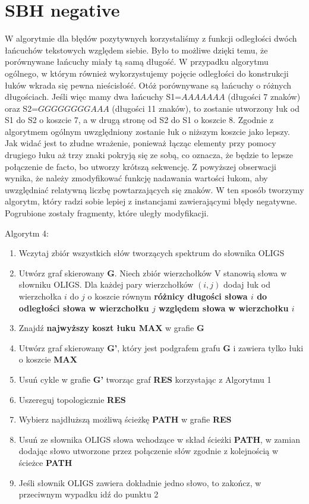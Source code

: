 \documentclass[a4paper,10pt]{article}
\begin{document}
\section{SBH negative}
W algorytmie dla błędów pozytywnych korzystaliśmy z funkcji odległości dwóch łańcuchów tekstowych względem siebie. Było to możliwe dzięki temu, że porównywane łańcuchy miały tą samą długość. W przypadku algorytmu ogólnego, w którym również wykorzystujemy pojęcie odległości do konstrukcji łuków wkrada się pewna nieścisłość. Otóż porównywane są łańcuchy o różnych długościach. Jeśli więc mamy dwa łańcuchy S1=$AAAAAAA$ (długości 7 znaków) oraz S2=$GGGGGGGGAAA$ (długości 11 znaków), to zostanie utworzony łuk od S1 do S2 o koszcie 7, a w drugą stronę od S2 do S1 o koszcie 8. Zgodnie z algorytmem ogólnym uwzględniony zostanie łuk o niższym koszcie jako lepszy. Jak widać jest to złudne wrażenie, ponieważ łącząc elementy przy pomocy drugiego łuku aż trzy znaki pokryją się ze sobą, co oznacza, że będzie to lepsze połączenie de facto, bo utworzy krótszą sekwencję.
Z powyższej obserwacji wynika, że należy zmodyfikować funkcję nadawania wartości łukom, aby uwzględniać relatywną liczbę powtarzających się znaków. W ten sposób tworzymy algorytm, który radzi sobie lepiej z instancjami zawierającymi błędy negatywne. Pogrubione zostały fragmenty, które uległy modyfikacji.

Algorytm 4:
\begin{enumerate}
 \item Wczytaj zbiór wszystkich słów tworzących spektrum do słownika OLIGS
 \item Utwórz graf skierowany {\bf G}. Niech zbiór wierzchołków V stanowią słowa w słowniku OLIGS. Dla każdej pary wierzchołków $(i,j)$ dodaj łuk od wierzchołka $i$ do $j$ o koszcie równym {\bf różnicy długości słowa $i$ do odległości słowa w wierzchołku $j$ względem słowa w wierzchołku $i$}
 \item Znajdź {\bf najwyższy koszt łuku MAX} w grafie {\bf G}
 \item Utwórz graf skierowany {\bf G'}, który jest podgrafem grafu {\bf G} i zawiera tylko łuki o koszcie {\bf MAX}
 \item Usuń cykle w grafie {\bf G'} tworząc graf {\bf RES} korzystając z Algorytmu 1
 \item Uszereguj topologicznie {\bf RES}
 \item Wybierz najdłuższą możliwą ścieżkę {\bf PATH} w grafie {\bf RES}
 \item Usuń ze słownika OLIGS słowa wchodzące w skład ścieżki {\bf PATH}, w zamian dodając słowo utworzone przez połączenie słów zgodnie z kolejnością w ścieżce {\bf PATH}
 \item Jeśli słownik OLIGS zawiera dokładnie jedno słowo, to zakończ, w przeciwnym wypadku idź do punktu 2
\end{enumerate}
\end{document}

